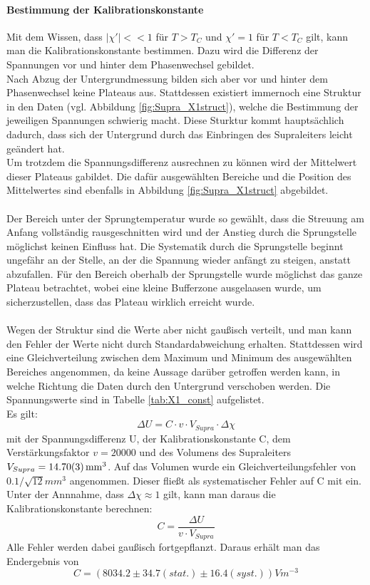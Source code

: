 \documentclass[12pt,a4paper]{article}
\begin{document}
\paragraph{Bestimmung der Kalibrationskonstante}
Mit dem Wissen, dass $|\chi'| << 1$ für $T>T_C$ und $\chi' = 1$ für $T<T_C$ gilt, kann man die Kalibrationskonstante bestimmen. Dazu wird die Differenz der Spannungen vor und hinter dem Phasenwechsel gebildet.\\
Nach Abzug der Untergrundmessung bilden sich aber vor und hinter dem Phasenwechsel keine Plateaus aus. Stattdessen existiert immernoch eine Struktur in den Daten (vgl. Abbildung \ref{fig:Supra_X1struct}), welche die Bestimmung der jeweiligen Spannungen schwierig macht. Diese Sturktur kommt hauptsächlich dadurch, dass sich der Untergrund durch das Einbringen des Supraleiters leicht geändert hat.\\
Um trotzdem die Spannungsdifferenz ausrechnen zu können wird der Mittelwert dieser Plateaus gabildet. Die dafür ausgewählten Bereiche und die Position des Mittelwertes sind ebenfalls in Abbildung \ref{fig:Supra_X1struct} abgebildet.\\
\\
Der Bereich unter der Sprungtemperatur wurde so gewählt, dass die Streuung am Anfang vollständig rausgeschnitten wird und der Anstieg durch die Sprungstelle möglichst keinen Einfluss hat. Die Systematik durch die Sprungstelle beginnt ungefähr an der Stelle, an der die Spannung wieder anfängt zu steigen, anstatt abzufallen. Für den Bereich oberhalb der Sprungstelle wurde möglichst das ganze Plateau betrachtet, wobei eine kleine Bufferzone ausgelaasen wurde, um sicherzustellen, dass das Plateau wirklich erreicht wurde.\\
\\
Wegen der Struktur sind die Werte aber nicht gaußisch verteilt, und man kann den Fehler der Werte nicht durch Standardabweichung erhalten. Stattdessen wird eine Gleichverteilung zwischen dem Maximum und Minimum des ausgewählten Bereiches angenommen, da keine Aussage darüber getroffen werden kann, in welche Richtung die Daten durch den Untergrund verschoben werden. Die Spannungswerte sind in Tabelle \ref{tab:X1_const} aufgelistet.\\
Es gilt:
\begin{equation}
\Delta U = C \cdot v \cdot V_{Supra} \cdot \Delta\chi
\end{equation}
mit der Spannungsdifferenz U, der Kalibrationskonstante C, dem Verstärkungsfaktor $v=20000$ und des Volumens des Supraleiters $V_{Supra} =\SI{ 14.7\pm 0.03}{mm^3}$. Auf das Volumen wurde ein Gleichverteilungsfehler von $0.1/\sqrt{12}mm^3$ angenommen. Dieser fließt als systematischer Fehler auf C mit ein. Unter der Annnahme, dass $\Delta\chi \approx 1$ gilt, kann man daraus die Kalibrationskonstante berechnen:
\begin{equation}
C = \dfrac{\Delta U}{v\cdot V_{Supra}}
\end{equation}
Alle Fehler werden dabei gaußisch fortgepflanzt. Daraus erhält man das Endergebnis von
\begin{equation*}
C = (8034.2\pm 34.7(stat.)\pm 16.4(syst.))\si{Vm^{-3}}
\end{equation*}
\end{document}
